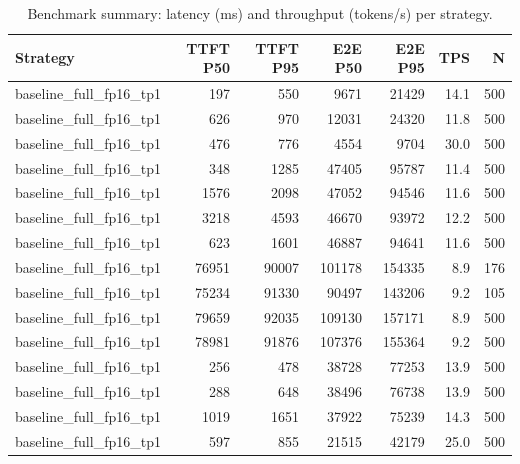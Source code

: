 \begin{table}
\caption{Benchmark summary: latency (ms) and throughput (tokens/s) per strategy.}
\label{tab:summary}
\begin{tabular}{lrrrrrr}
\toprule
Strategy & TTFT P50 & TTFT P95 & E2E P50 & E2E P95 & TPS & N \\
\midrule
baseline_full_fp16_tp1 & 197 & 550 & 9671 & 21429 & 14.1 & 500 \\
baseline_full_fp16_tp1 & 626 & 970 & 12031 & 24320 & 11.8 & 500 \\
baseline_full_fp16_tp1 & 476 & 776 & 4554 & 9704 & 30.0 & 500 \\
baseline_full_fp16_tp1 & 348 & 1285 & 47405 & 95787 & 11.4 & 500 \\
baseline_full_fp16_tp1 & 1576 & 2098 & 47052 & 94546 & 11.6 & 500 \\
baseline_full_fp16_tp1 & 3218 & 4593 & 46670 & 93972 & 12.2 & 500 \\
baseline_full_fp16_tp1 & 623 & 1601 & 46887 & 94641 & 11.6 & 500 \\
baseline_full_fp16_tp1 & 76951 & 90007 & 101178 & 154335 & 8.9 & 176 \\
baseline_full_fp16_tp1 & 75234 & 91330 & 90497 & 143206 & 9.2 & 105 \\
baseline_full_fp16_tp1 & 79659 & 92035 & 109130 & 157171 & 8.9 & 500 \\
baseline_full_fp16_tp1 & 78981 & 91876 & 107376 & 155364 & 9.2 & 500 \\
baseline_full_fp16_tp1 & 256 & 478 & 38728 & 77253 & 13.9 & 500 \\
baseline_full_fp16_tp1 & 288 & 648 & 38496 & 76738 & 13.9 & 500 \\
baseline_full_fp16_tp1 & 1019 & 1651 & 37922 & 75239 & 14.3 & 500 \\
baseline_full_fp16_tp1 & 597 & 855 & 21515 & 42179 & 25.0 & 500 \\
\bottomrule
\end{tabular}
\end{table}
